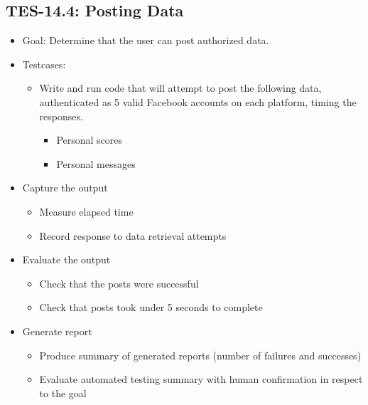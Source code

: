 \subsection{TES-14.4: Posting Data}
\begin{itemize}
\item Goal: Determine that the user can post authorized data.

\item Testcases: 
\begin{itemize}
\item Write and run code that will attempt to post the following data, 
authenticated as 5 valid Facebook accounts on each platform, 
timing the responses.
\begin{itemize}
\item Personal scores
\item Personal messages
\end{itemize}
\end{itemize}

\item Capture the output 
\begin{itemize}
\item Measure elapsed time 
\item Record response to data retrieval attempts
\end{itemize}

\item Evaluate the output 
\begin{itemize}
\item Check that the posts were successful
\item Check that posts took under 5 seconds to complete
\end{itemize}

\item Generate report 
\begin{itemize}
\item Produce summary of generated reports (number of failures and successes)
\item Evaluate automated testing summary with human confirmation in respect to the goal
\end{itemize} 
\end{itemize}

